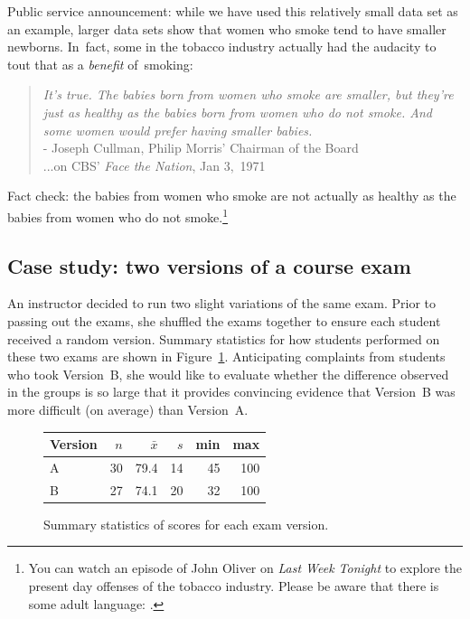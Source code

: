 Public service announcement: while we have used this relatively
small data set as an example, larger data sets show that women
who smoke tend to have smaller newborns.
In~fact, some in the tobacco industry actually had the audacity
to tout that as a \emph{benefit} of~smoking:
\begin{quotation}
  \noindent%
  \emph{It's true.
  The babies born from women who smoke are smaller,
  but they're just as healthy as the babies born from
  women who do not smoke.
  And some women would prefer having smaller babies.} \\[2mm]
  \indent\indent\indent\indent\indent\indent%
    - Joseph Cullman, Philip Morris' Chairman of the Board \\
  \indent\indent\indent\indent\indent\indent%
  {\color{white}...}on CBS' \emph{Face the Nation}, Jan 3,~1971
\end{quotation}
Fact check: the babies from women who smoke are not actually
as healthy as the babies from women who do not
smoke.\footnote{You can watch an episode of John Oliver
  on \emph{Last Week Tonight} to explore the present day
  offenses of the tobacco industry.
  Please be aware that there is some adult language:
  .}



\subsection{Case study: two versions of a course exam}


An instructor decided to run two slight variations of the same exam. Prior to passing out the exams, she shuffled the exams together to ensure each student received a random version. Summary statistics for how students performed on these two exams are shown in Figure~\ref{summaryStatsForTwoVersionsOfExams}. Anticipating complaints from students who took Version~B, she would like to evaluate whether the difference observed in the groups is so large that it provides convincing evidence that Version~B was more difficult (on average) than Version~A.

\begin{figure}[hht]
\centering
\begin{tabular}{l rrrrr}
\hline
Version\hspace{2mm}	& $n$	& $\bar{x}$	& $s$	& min	& max  \\
\hline
A		& 30		& 79.4		& 14 	& 45		& 100 \\
B		& 27		& 74.1		& 20		& 32		& 100 \\
\hline
\end{tabular}
\caption{Summary statistics of scores for each exam version.}
\label{summaryStatsForTwoVersionsOfExams}
\end{figure}

